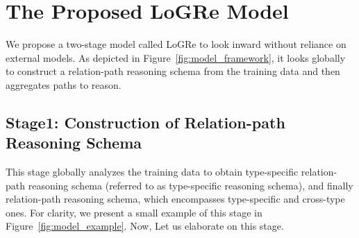 \documentclass[sigconf]{acmart}
\begin{document}
\section{The Proposed LoGRe Model}
\label{sec:proposed_model}
We propose a two-stage model called LoGRe to look inward without reliance on external models. As depicted in Figure~\ref{fig:model_framework}, it looks globally to construct a relation-path reasoning schema from the training data and then aggregates paths to reason.

\subsection{Stage1: Construction of Relation-path Reasoning Schema}
This stage globally analyzes the training data to obtain type-specific relation-path reasoning schema (referred to as type-specific reasoning schema), and finally relation-path reasoning schema, which encompasses type-specific and cross-type ones. For clarity, we present a small example of this stage in Figure~\ref{fig:model_example}. Now, Let us elaborate on this stage.
\end{document}
